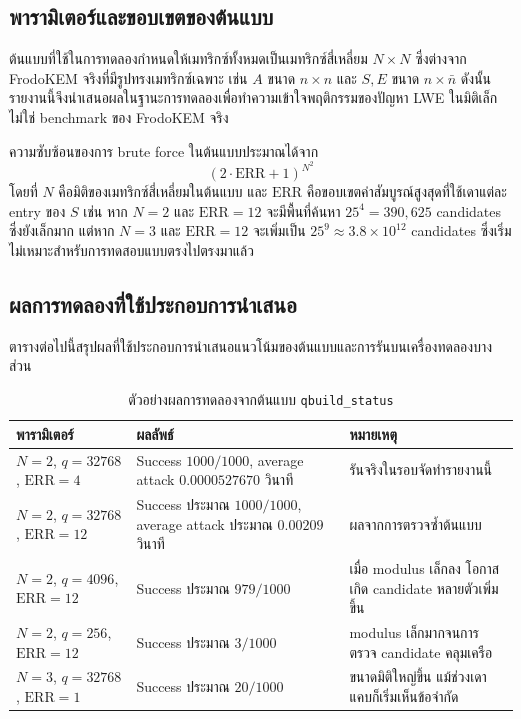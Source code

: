 \documentclass[14pt,a4paper]{extarticle}
\newcommand{\code}[1]{\texttt{#1}}
\begin{document}
\subsection{พารามิเตอร์และขอบเขตของต้นแบบ}
ต้นแบบที่ใช้ในการทดลองกำหนดให้เมทริกซ์ทั้งหมดเป็นเมทริกซ์สี่เหลี่ยม $N \times N$ ซึ่งต่างจาก FrodoKEM จริงที่มีรูปทรงเมทริกซ์เฉพาะ เช่น $A$ ขนาด $n \times n$ และ $S,E$ ขนาด $n \times \bar n$ ดังนั้นรายงานนี้จึงนำเสนอผลในฐานะการทดลองเพื่อทำความเข้าใจพฤติกรรมของปัญหา LWE ในมิติเล็ก ไม่ใช่ benchmark ของ FrodoKEM จริง

ความซับซ้อนของการ brute force ในต้นแบบประมาณได้จาก
\[
    (2\cdot \text{ERR}+1)^{N^2}
\]
โดยที่ $N$ คือมิติของเมทริกซ์สี่เหลี่ยมในต้นแบบ และ $\text{ERR}$ คือขอบเขตค่าสัมบูรณ์สูงสุดที่ใช้เดาแต่ละ entry ของ $S$ เช่น หาก $N=2$ และ $\text{ERR}=12$ จะมีพื้นที่ค้นหา $25^4 = 390{,}625$ candidates ซึ่งยังเล็กมาก แต่หาก $N=3$ และ $\text{ERR}=12$ จะเพิ่มเป็น $25^9 \approx 3.8\times 10^{12}$ candidates ซึ่งเริ่มไม่เหมาะสำหรับการทดสอบแบบตรงไปตรงมาแล้ว

\subsection{ผลการทดลองที่ใช้ประกอบการนำเสนอ}
ตารางต่อไปนี้สรุปผลที่ใช้ประกอบการนำเสนอแนวโน้มของต้นแบบและการรันบนเครื่องทดลองบางส่วน

\begin{table}[H]
    \centering
    \caption{ตัวอย่างผลการทดลองจากต้นแบบ \code{qbuild\_status}}
    \begin{tabular}{>{\raggedright\arraybackslash}p{} >{\raggedright\arraybackslash}p{} >{\raggedright\arraybackslash}p{}}
        \toprule
        พารามิเตอร์ & ผลลัพธ์ & หมายเหตุ \\
        \midrule
        $N=2$, $q=32768$, $\text{ERR}=4$ & Success $1000/1000$, average attack $0.0000527670$ วินาที & รันจริงในรอบจัดทำรายงานนี้ \\
        $N=2$, $q=32768$, $\text{ERR}=12$ & Success ประมาณ $1000/1000$, average attack ประมาณ $0.00209$ วินาที & ผลจากการตรวจซ้ำต้นแบบ \\
        $N=2$, $q=4096$, $\text{ERR}=12$ & Success ประมาณ $979/1000$ & เมื่อ modulus เล็กลง โอกาสเกิด candidate หลายตัวเพิ่มขึ้น \\
        $N=2$, $q=256$, $\text{ERR}=12$ & Success ประมาณ $3/1000$ & modulus เล็กมากจนการตรวจ candidate คลุมเครือ \\
        $N=3$, $q=32768$, $\text{ERR}=1$ & Success ประมาณ $20/1000$ & ขนาดมิติใหญ่ขึ้น แม้ช่วงเดาแคบก็เริ่มเห็นข้อจำกัด \\
        \bottomrule
    \end{tabular}
\end{table}
\end{document}
